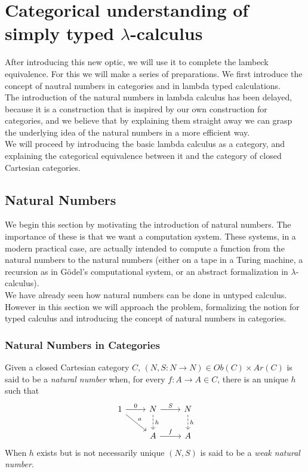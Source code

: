 \section{Categorical understanding of simply typed $\lambda$-calculus}
After introducing this new optic, we will use it to complete the lambeck equivalence. For this we will make a series of preparations. We first introduce the concept of nautral numbers in categories and in lambda typed calculations.\\

The introduction of the natural numbers in lambda calculus has been delayed, because it is a construction that is inspired by our own construction for categories, and we believe that by explaining them straight away we can grasp the underlying idea of the natural numbers in a more efficient way.\\

We will proceed by introducing the basic lambda calculus as a category, and explaining the categorical equivalence between it and the category of closed Cartesian categories.

\subsection{Natural Numbers}


We begin this section by motivating the introduction of natural numbers. The importance of these is that we want a computation system. These systems, in a modern practical case, are actually intended to compute a function from the natural numbers to the natural numbers (either on a tape in a Turing machine, a recursion as in Gödel's computational system, or an abstract formalization in $\lambda$-calculus).\\

We have already seen how natural numbers can be done in untyped calculus. However in this section we will approach the problem, formalizing the notion for typed calculus and introducing the concept of natural numbers in categories.

\subsubsection{Natural Numbers in Categories}


\begin{definition}
  Given a closed Cartesian category $C$,  $(N,S:N\to N)\in Ob(C)\times Ar(C)$ is said to be a \emph{natural number} when, for every $f:A\to A\in C$, there is an unique $h$ such that
  \[
    \begin{tikzcd}
      1\arrow{dr}{a}\arrow{r}{0} & N\arrow{r}{S}\arrow[dashed]{d}{h} & N\arrow[dashed]{d}{h}\\
      & A\arrow{r}{f} & A
    \end{tikzcd}
  \]
  When $h$ exists but is not necessarily unique $(N,S)$ is said to be a \emph{weak natural number}.
\end{definition}

